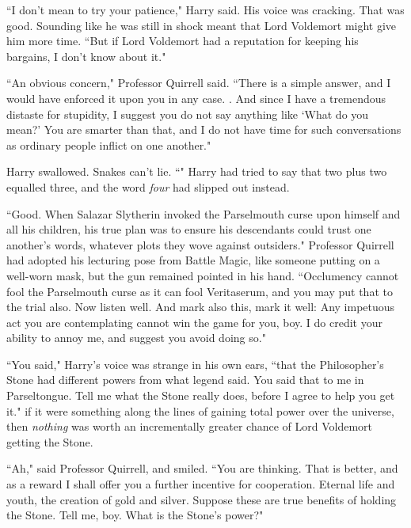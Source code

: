 ``I don't mean to try your patience," Harry said. His voice was cracking. That was good. Sounding like he was still in shock meant that Lord Voldemort might give him more time. ``But if Lord Voldemort had a reputation for keeping his bargains, I don't know about it."

``An obvious concern," Professor Quirrell said. ``There is a simple answer, and I would have enforced it upon you in any case. . And since I have a tremendous distaste for stupidity, I suggest you do not say anything like `What do you mean?' You are smarter than that, and I do not have time for such conversations as ordinary people inflict on one another."

Harry swallowed. Snakes can't lie. ``" Harry had tried to say that two plus two equalled three, and the word \emph{four} had slipped out instead.

``Good. When Salazar Slytherin invoked the Parselmouth curse upon himself and all his children, his true plan was to ensure his descendants could trust one another's words, whatever plots they wove against outsiders." Professor Quirrell had adopted his lecturing pose from Battle Magic, like someone putting on a well-worn mask, but the gun remained pointed in his hand. ``Occlumency cannot fool the Parselmouth curse as it can fool Veritaserum, and you may put that to the trial also. Now listen well.  And mark also this, mark it well:  Any impetuous act you are contemplating cannot win the game for you, boy. I do credit your ability to annoy me, and suggest you avoid doing so."

``You said," Harry's voice was strange in his own ears, ``that the Philosopher's Stone had different powers from what legend said. You said that to me in Parseltongue. Tell me what the Stone really does, before I agree to help you get it." if it were something along the lines of gaining total power over the universe, then \emph{nothing} was worth an incrementally greater chance of Lord Voldemort getting the Stone.

``Ah," said Professor Quirrell, and smiled. ``You are thinking. That is better, and as a reward I shall offer you a further incentive for cooperation. Eternal life and youth, the creation of gold and silver. Suppose these are true benefits of holding the Stone. Tell me, boy. What is the Stone's power?"

